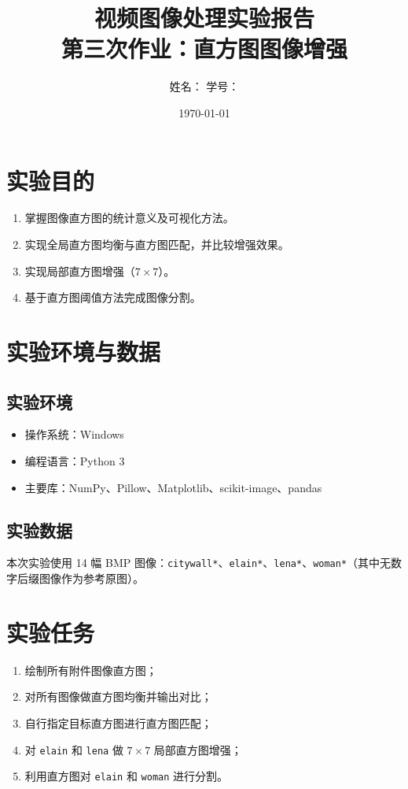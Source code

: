 \documentclass[UTF8,a4paper,12pt]{ctexart}
\title{视频图像处理实验报告\\第三次作业：直方图图像增强}
\author{姓名：\underline{\hspace{3cm}} \quad 学号：\underline{\hspace{3cm}}}
\date{\today}
\begin{document}
\maketitle
\tableofcontents
\newpage

\section{实验目的}
\begin{enumerate}
  \item 掌握图像直方图的统计意义及可视化方法。
  \item 实现全局直方图均衡与直方图匹配，并比较增强效果。
  \item 实现局部直方图增强（$7\times 7$）。
  \item 基于直方图阈值方法完成图像分割。
\end{enumerate}

\section{实验环境与数据}
\subsection{实验环境}
\begin{itemize}
  \item 操作系统：Windows
  \item 编程语言：Python 3
  \item 主要库：NumPy、Pillow、Matplotlib、scikit-image、pandas
\end{itemize}

\subsection{实验数据}
本次实验使用 14 幅 BMP 图像：\texttt{citywall*}、\texttt{elain*}、\texttt{lena*}、\texttt{woman*}（其中无数字后缀图像作为参考原图）。

\section{实验任务}
\begin{enumerate}
  \item 绘制所有附件图像直方图；
  \item 对所有图像做直方图均衡并输出对比；
  \item 自行指定目标直方图进行直方图匹配；
  \item 对 \texttt{elain} 和 \texttt{lena} 做 $7\times7$ 局部直方图增强；
  \item 利用直方图对 \texttt{elain} 和 \texttt{woman} 进行分割。
\end{enumerate}
\end{document}
